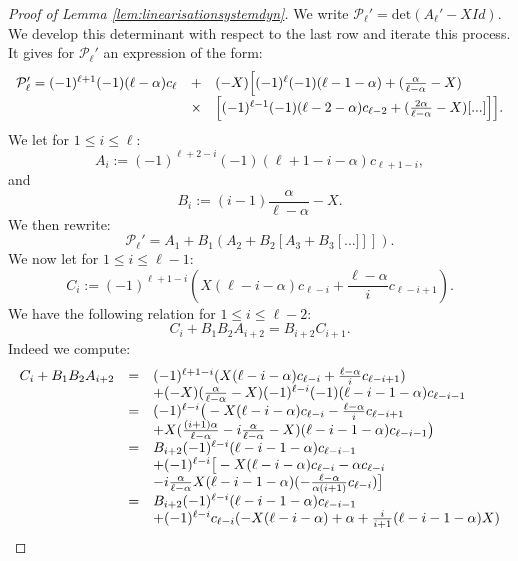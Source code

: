 \documentclass[11pt,a4paper,reqno]{amsart}
\theoremstyle{remark}
\numberwithin{equation}{section}
\begin{document}
\begin{proof}[Proof of Lemma \ref{lem:linearisationsystemdyn}]
We write $\mathcal{P}_{\ell}'=\text{det}(A_{\ell}'-XId)$. We develop this determinant with respect to the last row and iterate this process. It gives for $\mathcal{P}_{\ell}'$ an expression of the form:
$$
\begin{array}{r c l}
\mathcal{P}_{\ell}'=(-1)^{\ell+1}(-1)(\ell-\alpha)c_{\ell} &+&(-X)\Bigl{[}(-1)^{\ell}(-1)(\ell-1-\alpha)+(\frac{\alpha}{\ell-\alpha}-X)\\
&\times&\left[(-1)^{\ell-1}(-1)(\ell-2-\alpha)c_{\ell-2}+(\frac{2\alpha}{\ell-\alpha}-X)[...]\right]\Bigr{]} .
\end{array}
$$
We let for $1 \leq i \leq \ell$:
\begin{equation}
A_i:=(-1)^{\ell+2-i}(-1)(\ell+1-i-\alpha)c_{\ell+1-i} ,
\end{equation}
and
\begin{equation}
B_i:=(i-1)\frac{\alpha}{\ell-\alpha}-X .
\end{equation}
We then rewrite:
$$
\mathcal{P}_{\ell}'=A_1+B_1\left(A_2+B_2\left[A_3+B_3\left[...]\right]\right]\right) .
$$
We now let for $1\leq i \leq \ell-1$:
\begin{equation}
C_i:=(-1)^{\ell+1-i}(X(\ell-i-\alpha)c_{\ell-i}+\frac{\ell-\alpha}{i}c_{\ell-i+1}) .
\end{equation}
We have the following relation for $1\leq i \leq \ell-2$:
\begin{equation}
C_i+B_1B_2A_{i+2}=B_{i+2}C_{i+1} .
\end{equation}
Indeed we compute:
$$
\begin{array}{r c l}
C_i+B_1B_2A_{i+2}&=&(-1)^{\ell+1-i}(X(\ell-i-\alpha)c_{\ell-i}+\frac{\ell-\alpha}{i}c_{\ell-i+1}) \\
&&+(-X)(\frac{\alpha}{\ell-\alpha}-X)(-1)^{\ell-i}(-1)(\ell-i-1-\alpha)c_{\ell-i-1} \\
&=& (-1)^{\ell-i}\big{(}-X(\ell-i-\alpha)c_{\ell-i}-\frac{\ell-\alpha}{i}c_{\ell-i+1} \\
&&+X(\frac{(i+1)\alpha}{\ell-\alpha}-i\frac{\alpha}{\ell-\alpha}-X)(\ell-i-1-\alpha)c_{\ell-i-1}\big{)} \\
&=& B_{i+2}(-1)^{\ell-i}(\ell-i-1-\alpha)c_{\ell-i-1} \\
&& + (-1)^{\ell-i}\big{[} -X(\ell-i-\alpha)c_{\ell-i}-\alpha c_{\ell-i}\\
&&-i\frac{\alpha}{\ell-\alpha}X(\ell-i-1-\alpha)(-\frac{\ell-\alpha}{\alpha(i+1)}c_{\ell-i})\big{]} \\
&=& B_{i+2}(-1)^{\ell-i}(\ell-i-1-\alpha)c_{\ell-i-1} \\
&& + (-1)^{\ell-i}c_{\ell-i}(-X(\ell-i-\alpha)+\alpha+\frac{i}{i+1}(\ell-i-1-\alpha)X) \\

\end{array}$$
\end{proof}
\end{document}
